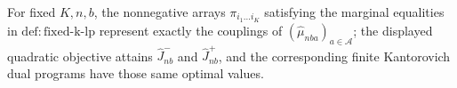 For fixed \(K,n,b\), the nonnegative arrays \(\pi_{i_1\ldots i_K}\) satisfying the marginal equalities in \(\mathrm{def:fixed\text{-}k\text{-}lp}\) represent exactly the couplings of \((\widehat\mu_{nba})_{a\in\mathcal A}\); the displayed quadratic objective attains \(\widehat J_{nb}^{-}\) and \(\widehat J_{nb}^{+}\), and the corresponding finite Kantorovich dual programs have those same optimal values.